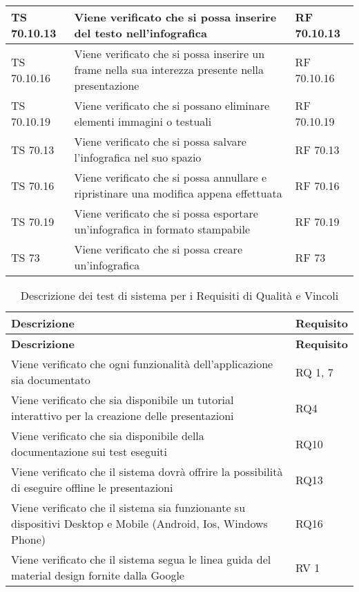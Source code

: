 {{\begin{longtable} [c]{| p{3cm} | p{6cm} |p{3cm}|}
			\hline
			TS 70.10.13 & Viene verificato che si possa inserire del testo nell'infografica\ped{g} & RF 70.10.13\\
			\hline
			TS 70.10.16 & Viene verificato che si possa inserire un frame\ped{g} nella sua interezza presente nella presentazione & RF 70.10.16\\
			\hline
			TS 70.10.19 & Viene verificato che si possano eliminare elementi immagini o testuali & RF 70.10.19\\
			\hline
			TS 70.13 & Viene verificato che si possa salvare l'infografica\ped{g} nel suo spazio & RF 70.13\\
			\hline
			TS 70.16 & Viene verificato che si possa annullare e ripristinare una modifica appena effettuata & RF 70.16\\
			\hline
			TS 70.19 & Viene verificato che si possa esportare un'infografica\ped{g} in formato stampabile & RF 70.19\\
			\hline
			TS 73 & Viene verificato che si possa creare un'infografica\ped{g} & RF 73\\
			\hline
\end{longtable}

		\renewcommand*{\arraystretch}{1.4}
		\begin{longtable} [c]{| p{7cm} |p{4cm}|}
			\caption{
			Descrizione dei test di sistema
			per i Requisiti di Qualità e Vincoli \label{tab:verReqQualVinc}}\\
			 \hline
			 \textbf{Descrizione} & \textbf{Requisito} \\
			 \hline
			 \endfirsthead
			 \hline
			 \textbf{Descrizione} & \textbf{Requisito} \\
			 \hline
			\endhead
			 \hline
			 \endfoot
			 \hline
			 \endlastfoot
			Viene verificato che ogni funzionalità dell'applicazione sia documentato & RQ\ped{g} 1, 7\\
			\hline
			Viene verificato che sia disponibile un tutorial interattivo per la creazione delle presentazioni & RQ4\\
			\hline
			Viene verificato che sia disponibile della documentazione sui test eseguiti & RQ10\\
			\hline
			Viene verificato che il sistema dovrà offrire la possibilità di eseguire offline le presentazioni & RQ13\\
			\hline
			Viene verificato che il sistema sia funzionante su dispositivi Desktop\ped{g} e Mobile (Android\ped{g}, Ios, Windows\ped{g} Phone) & RQ16\\
			\hline
			Viene verificato che il sistema segua le linea guida del material design fornite dalla Google & RV 1\\
\end{longtable}
}
}
